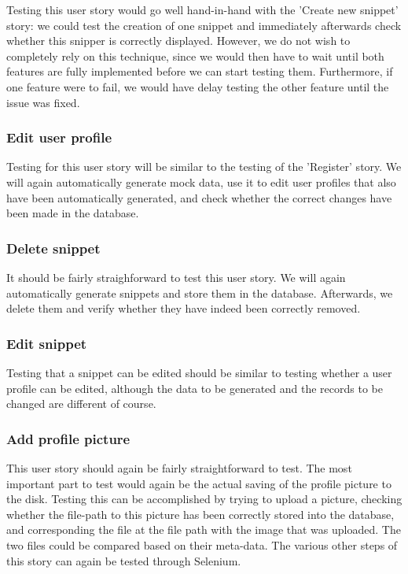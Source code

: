 \documentclass[10pt,a4paper,BCOR12mm, headexclude, footexclude,
  twoside, openright]{scrartcl}
\numberwithin{equation}{section} %
\numberwithin{figure}{section} %
\numberwithin{table}{section} %
\begin{document}
Testing this user story would go well hand-in-hand with the 'Create new snippet'
story: we could test the creation of one snippet and immediately afterwards
check whether this snipper is correctly displayed.  However, we do not wish to
completely rely on this technique, since we would then have to wait until both
features are fully implemented before we can start testing them. Furthermore, if
one feature were to fail, we would have delay testing the other feature until
the issue was fixed.

\subsubsection*{Edit user profile}
Testing for this user story will be similar to the testing of the 'Register'
story. We will again automatically generate mock data, use it to edit user
profiles that also have been automatically generated, and check whether the
correct changes have been made in the database.

\subsubsection*{Delete snippet}
It should be fairly straighforward to test this user story. We will again
automatically generate snippets and store them in the database. Afterwards, we
delete them and verify whether they have indeed been correctly removed.

\subsubsection*{Edit snippet}
Testing that a snippet can be edited should be similar to testing whether a user profile can be edited, although the data to be generated and the records to be changed are different of course.

\subsubsection*{Add profile picture}
This user story should again be fairly straightforward to test. The most important part to test would again be the actual saving of the profile picture to the disk.
Testing this can be accomplished by trying to upload a picture, checking whether the file-path to this picture has been correctly stored into the database, and corresponding the file at the file path with the image that was uploaded.
The two files could be compared based on their meta-data.
The various other steps of this story can again be tested through Selenium.
\end{document}
